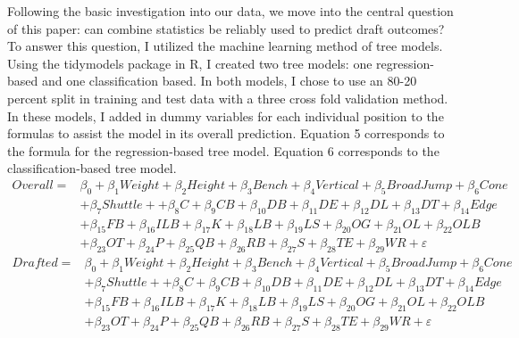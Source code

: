 \documentclass[12pt,english]{article}
\begin{document}
Following the basic investigation into our data, we move into the central question of this paper: can combine statistics be reliably used to predict draft outcomes? To answer this question, I utilized the machine learning method of tree models. Using the tidymodels package in R, I created two tree models: one regression-based and one classification based. In both models, I chose to use an 80-20 percent split in training and test data with a three cross fold validation method. 
In these models, I added in dummy variables for each individual position to the formulas to assist the model in its overall prediction. Equation 5 corresponds to the formula for the regression-based tree model. Equation 6 corresponds to the classification-based tree model. 
\begin{equation}
\label{eq:3}
\begin{split}
    Overall = & \beta_{0} + \beta_{1}Weight + \beta_{2}Height + \beta_{3}Bench + \beta_{4}Vertical + \beta_{5}BroadJump + \beta_{6}Cone \\& + \beta_{7}Shuttle + + \beta_{8}C + \beta_{9}CB + \beta_{10}DB + \beta_{11}DE + \beta_{12}DL + \beta_{13}DT + \beta_{14}Edge \\& + \beta_{15}FB + \beta_{16}ILB + \beta_{17}K + \beta_{18}LB + \beta_{19}LS + \beta_{20}OG + \beta_{21}OL + \beta_{22}OLB \\& + \beta_{23}OT + \beta_{24}P + \beta_{25}QB + \beta_{26}RB + \beta_{27}S + \beta_{28}TE + \beta_{29}WR + \varepsilon
\end{split}
\end{equation}
\begin{equation}
\label{eq:3}
\begin{split}
    Drafted = & \beta_{0} + \beta_{1}Weight + \beta_{2}Height + \beta_{3}Bench + \beta_{4}Vertical + \beta_{5}BroadJump + \beta_{6}Cone \\& + \beta_{7}Shuttle + + \beta_{8}C + \beta_{9}CB + \beta_{10}DB + \beta_{11}DE + \beta_{12}DL + \beta_{13}DT + \beta_{14}Edge \\& + \beta_{15}FB + \beta_{16}ILB + \beta_{17}K + \beta_{18}LB + \beta_{19}LS + \beta_{20}OG + \beta_{21}OL + \beta_{22}OLB \\& + \beta_{23}OT + \beta_{24}P + \beta_{25}QB + \beta_{26}RB + \beta_{27}S + \beta_{28}TE + \beta_{29}WR + \varepsilon
\end{split}
\end{equation}
\end{document}

